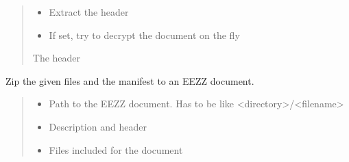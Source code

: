\documentclass[letterpaper,10pt,english]{sphinxmanual}
\begin{document}
\begin{savenotes}
\begin{fulllineitems}
\begin{savenotes}
\begin{fulllineitems}
\begin{quote}
\begin{description}
\begin{itemize}
\item {} 
\sphinxAtStartPar
{} \textendash{} Extract the header

\item {} 
\sphinxAtStartPar
{} \textendash{} If set, try to decrypt the document on the fly

\end{itemize}

\sphinxAtStartPar
The header

\end{description}\end{quote}

\end{fulllineitems}\end{savenotes}


\begin{savenotes}\begin{fulllineitems}
\label{\detokenize{eezz:eezz.document.TDocuments.zip}}
\pysigstartsignatures
{}
\pysigstopsignatures
\sphinxAtStartPar
Zip the given files and the manifest to an EEZZ document.
\begin{quote}\begin{description}
\begin{itemize}
\item {} 
\sphinxAtStartPar
{} \textendash{} Path to the EEZZ document. Has to be like \textless{}directory\textgreater{}/\textless{}filename\textgreater{}

\item {} 
\sphinxAtStartPar
{} \textendash{} Description and header

\item {} 
\sphinxAtStartPar
{} \textendash{} Files included for the document

\end{itemize}

\end{description}\end{quote}

\end{fulllineitems}\end{savenotes}


\end{fulllineitems}\end{savenotes}
\end{document}
